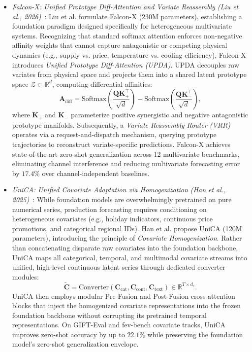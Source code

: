 \begin{itemize}[leftmargin=*]
    \item \emph{Falcon-X: Unified Prototype Diff-Attention and Variate Reassembly (Liu et al., 2026)}~\cite{liu2026falconx}: Liu et al. formulate Falcon-X (230M parameters), establishing a foundation paradigm designed specifically for heterogeneous multivariate systems. Recognizing that standard softmax attention enforces non-negative affinity weights that cannot capture antagonistic or competing physical dynamics (e.g., supply vs. price, temperature vs. cooling efficiency), Falcon-X introduces \emph{Unified Prototype Diff-Attention (UPDA)}. UPDA decouples raw variates from physical space and projects them into a shared latent prototype space $\mathcal{Z} \subset \mathbb{R}^d$, computing differential affinities:
    \begin{equation}
        \mathbf{A}_{\text{diff}} = \text{Softmax}\left(\frac{\mathbf{Q}\mathbf{K}_+^\top}{\sqrt{d}}\right) - \text{Softmax}\left(\frac{\mathbf{Q}\mathbf{K}_-^\top}{\sqrt{d}}\right),
    \end{equation}
    where $\mathbf{K}_+$ and $\mathbf{K}_-$ parameterize positive synergistic and negative antagonistic prototype manifolds. Subsequently, a \emph{Variate Reassembly Router (VRR)} operates via a request-and-dispatch mechanism, querying prototype trajectories to reconstruct variate-specific predictions. Falcon-X achieves state-of-the-art zero-shot generalization across 12 multivariate benchmarks, eliminating channel interference and reducing multivariate forecasting error by $17.4\%$ over channel-independent baselines.

    \item \emph{UniCA: Unified Covariate Adaptation via Homogenization (Han et al., 2025)}~\cite{han2025unica}: While foundation models are overwhelmingly pretrained on pure numerical series, production forecasting requires conditioning on heterogeneous covariates (e.g., holiday indicators, continuous price promotions, and categorical regional IDs). Han et al. propose UniCA (120M parameters), introducing the principle of \emph{Covariate Homogenization}. Rather than concatenating disparate raw covariates into the foundation backbone, UniCA maps all categorical, temporal, and multimodal covariate streams into unified, high-level continuous latent series through dedicated converter modules:
    \begin{equation}
        \tilde{\mathbf{C}} = \text{Converter}(\mathbf{C}_{\text{cat}}, \mathbf{C}_{\text{cont}}, \mathbf{C}_{\text{text}}) \in \mathbb{R}^{T \times d_c}.
    \end{equation}
    UniCA then employs modular Pre-Fusion and Post-Fusion cross-attention blocks that inject the homogenized covariate representations into the frozen foundation backbone without corrupting its pretrained temporal representations. On GIFT-Eval and fev-bench covariate tracks, UniCA improves zero-shot accuracy by up to $22.1\%$ while preserving the foundation model's zero-shot generalization envelope.


\end{itemize}
